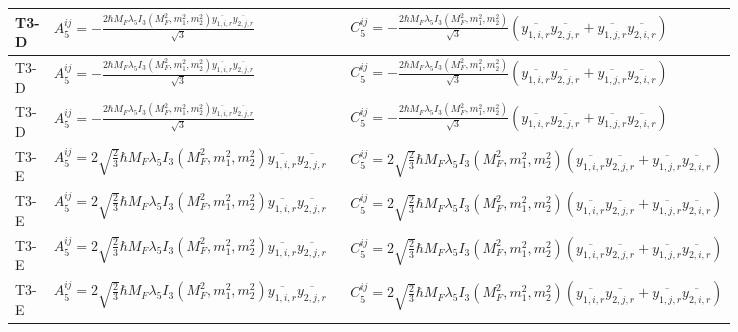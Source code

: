 \documentclass[8pt]{article}
\begin{document}
\begin{landscape}
\begin{longtable}{@{}l >{\raggedright\arraybackslash}p{0.42\linewidth} >{\raggedright\arraybackslash}p{0.42\linewidth}@{}}
\midrule
T3-D & \(\displaystyle A_5^{ij}=-\frac{2 \hbar  M_F \lambda_5 I_3\left(M_F^2,m_1^2,m_2^2\right) \overline{y_{1,i,r}} \overline{y_{2,j,r}}}{\sqrt{3}}\) & \(\displaystyle C_5^{ij}=-\frac{2 \hbar  M_F \lambda_5 I_3\left(M_F^2,m_1^2,m_2^2\right) }{\sqrt{3}}\left(\overline{y_{1,i,r}} \overline{y_{2,j,r}}+\overline{y_{1,j,r}} \overline{y_{2,i,r}}\right)\) \\
\midrule
T3-D & \(\displaystyle A_5^{ij}=-\frac{2 \hbar  M_F \lambda_5 I_3\left(M_F^2,m_1^2,m_2^2\right) \overline{y_{1,i,r}} \overline{y_{2,j,r}}}{\sqrt{3}}\) & \(\displaystyle C_5^{ij}=-\frac{2 \hbar  M_F \lambda_5 I_3\left(M_F^2,m_1^2,m_2^2\right) }{\sqrt{3}}\left(\overline{y_{1,i,r}} \overline{y_{2,j,r}}+\overline{y_{1,j,r}} \overline{y_{2,i,r}}\right)\) \\
\midrule
T3-D & \(\displaystyle A_5^{ij}=-\frac{2 \hbar  M_F \lambda_5 I_3\left(M_F^2,m_1^2,m_2^2\right) \overline{y_{1,i,r}} \overline{y_{2,j,r}}}{\sqrt{3}}\) & \(\displaystyle C_5^{ij}=-\frac{2 \hbar  M_F \lambda_5 I_3\left(M_F^2,m_1^2,m_2^2\right) }{\sqrt{3}}\left(\overline{y_{1,i,r}} \overline{y_{2,j,r}}+\overline{y_{1,j,r}} \overline{y_{2,i,r}}\right)\) \\
\midrule
T3-E & \(\displaystyle A_5^{ij}=2 \sqrt{\frac{2}{3}} \hbar  M_F \lambda_5 I_3\left(M_F^2,m_1^2,m_2^2\right) \overline{y_{1,i,r}} \overline{y_{2,j,r}}\) & \(\displaystyle C_5^{ij}=2 \sqrt{\frac{2}{3}} \hbar  M_F \lambda_5 I_3\left(M_F^2,m_1^2,m_2^2\right)\left(\overline{y_{1,i,r}} \overline{y_{2,j,r}}+\overline{y_{1,j,r}} \overline{y_{2,i,r}}\right)\) \\
\midrule
T3-E & \(\displaystyle A_5^{ij}=2 \sqrt{\frac{2}{3}} \hbar  M_F \lambda_5 I_3\left(M_F^2,m_1^2,m_2^2\right) \overline{y_{1,i,r}} \overline{y_{2,j,r}}\) & \(\displaystyle C_5^{ij}=2 \sqrt{\frac{2}{3}} \hbar  M_F \lambda_5 I_3\left(M_F^2,m_1^2,m_2^2\right)\left(\overline{y_{1,i,r}} \overline{y_{2,j,r}}+\overline{y_{1,j,r}} \overline{y_{2,i,r}}\right)\) \\
\midrule
T3-E & \(\displaystyle A_5^{ij}=2 \sqrt{\frac{2}{3}} \hbar  M_F \lambda_5 I_3\left(M_F^2,m_1^2,m_2^2\right) \overline{y_{1,i,r}} \overline{y_{2,j,r}}\) & \(\displaystyle C_5^{ij}=2 \sqrt{\frac{2}{3}} \hbar  M_F \lambda_5 I_3\left(M_F^2,m_1^2,m_2^2\right)\left(\overline{y_{1,i,r}} \overline{y_{2,j,r}}+\overline{y_{1,j,r}} \overline{y_{2,i,r}}\right)\) \\
\midrule
T3-E & \(\displaystyle A_5^{ij}=2 \sqrt{\frac{2}{3}} \hbar  M_F \lambda_5 I_3\left(M_F^2,m_1^2,m_2^2\right) \overline{y_{1,i,r}} \overline{y_{2,j,r}}\) & \(\displaystyle C_5^{ij}=2 \sqrt{\frac{2}{3}} \hbar  M_F \lambda_5 I_3\left(M_F^2,m_1^2,m_2^2\right)\left(\overline{y_{1,i,r}} \overline{y_{2,j,r}}+\overline{y_{1,j,r}} \overline{y_{2,i,r}}\right)\) \\
\midrule
\bottomrule
\end{longtable}
\end{landscape}
\end{document}
